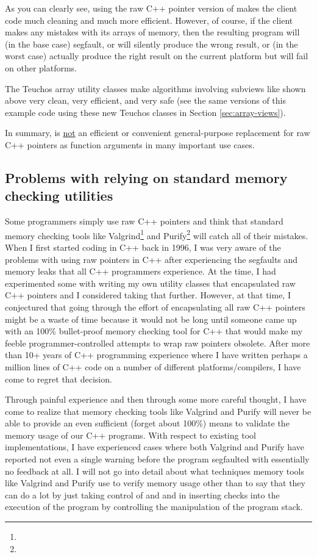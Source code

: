 \documentclass[pdf,ps2pdf,11pt]{SANDreport}
\begin{document}
As you can clearly see, using the raw C++ pointer version of
{} makes the client code much cleaning
and much more efficient.  However, of course, if the client makes any
mistakes with its arrays of memory, then the resulting program will
(in the base case) segfault, or will silently produce the wrong
result, or (in the worst case) actually produce the right result on
the current platform but will fail on other platforms.

The Teuchos array utility classes make algorithms involving subviews
like shown above very clean, very efficient, and very safe (see the
same versions of this example code using these new Teuchos classes in
Section {}\ref{sec:array-views}).

In summary, {} is {}\underline{not} an efficient
or convenient general-purpose replacement for raw C++ pointers as
function arguments in many important use cases.


%
{}\subsection{Problems with relying on standard memory checking
utilities}
\label{sec:problems-with-mem-checkers}
%

Some programmers simply use raw C++ pointers and think that standard
memory checking tools like
Valgrind\footnote{{}} and
Purify\footnote{}
will catch all of their mistakes.  When I first started coding in C++
back in 1996, I was very aware of the problems with using raw pointers
in C++ after experiencing the segfaults and memory leaks that all C++
programmers experience.  At the time, I had experimented some with
writing my own utility classes that encapsulated raw C++ pointers and
I considered taking that further.  However, at that time, I
conjectured that going through the effort of encapsulating all raw C++
pointers might be a waste of time because it would not be long until
someone came up with an 100\% bullet-proof memory checking tool for
C++ that would make my feeble programmer-controlled attempts to wrap
raw pointers obsolete.  After more than 10+ years of C++ programming
experience where I have written perhaps a million lines of C++ code on
a number of different platforms/compilers, I have come to regret that
decision.

Through painful experience and then through some more careful thought,
I have come to realize that memory checking tools like Valgrind and
Purify will never be able to provide an even sufficient (forget about
100\%) means to validate the memory usage of our C++ programs.  With
respect to existing tool implementations, I have experienced cases
where both Valgrind and Purify have reported not even a single warning
before the program segfaulted with essentially no feedback at all.  I
will not go into detail about what techniques memory tools like
Valgrind and Purify use to verify memory usage other than to say that
they can do a lot by just taking control of {} and
{} and in inserting checks into the execution of the
program by controlling the manipulation of the program stack.
\end{document}
